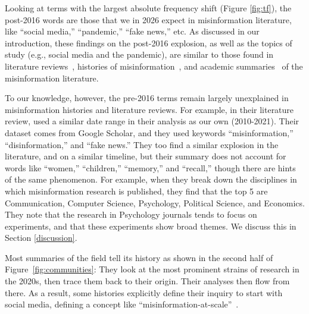 \documentclass[          
 pre,
 twocolumn,
 twoside,
 superscriptaddress,
 amsmath,
 amssymb,                
 apsf
]{revtex4-2}
\begin{document}
Looking at terms with the largest absolute frequency shift (Figure \ref{fig:tf}), the post-2016 words are those that we in 2026 expect in misinformation literature, like ``social media,'' ``pandemic,'' ``fake news,'' etc. As discussed in our introduction, these findings on the post-2016 explosion, as well as the topics of study (e.g., social media and the pandemic), are similar to those found in literature reviews~\cite{broda_misinformation_2024}, histories of misinformation~\cite{donovan_express_2025}, and academic summaries~\cite{posetti_short_2018} of the misinformation literature.

To our knowledge, however, the pre-2016 terms remain largely unexplained in misinformation histories and literature reviews. For example, in their literature review, \citet{broda_misinformation_2024} used a similar date range in their analysis as our own (2010-2021). Their dataset comes from Google Scholar, and they used keywords ``misinformation,'' ``disinformation,'' and ``fake news.'' They too find a similar explosion in the literature, and on a similar timeline, but their summary does not account for words like ``women,'' ``children,'' ``memory,'' and ``recall,'' though there are hints of the same phenomenon. For example, when they break down the disciplines in which misinformation research is published, they find that the top 5 are Communication, Computer Science, Psychology, Political Science, and Economics. They note that the research in Psychology journals tends to focus on experiments, and that these experiments show broad themes. We discuss this in Section \ref{discussion}.



Most summaries of the field tell its history as shown in the second half of Figure~\ref{fig:communities}: They look at the most prominent strains of research in the 2020s, then trace them back to their origin. Their analyses then flow from there. As a result, some histories explicitly define their inquiry to start with social media, defining a concept like ``misinformation-at-scale''~\cite{donovan_express_2025}.
\end{document}
